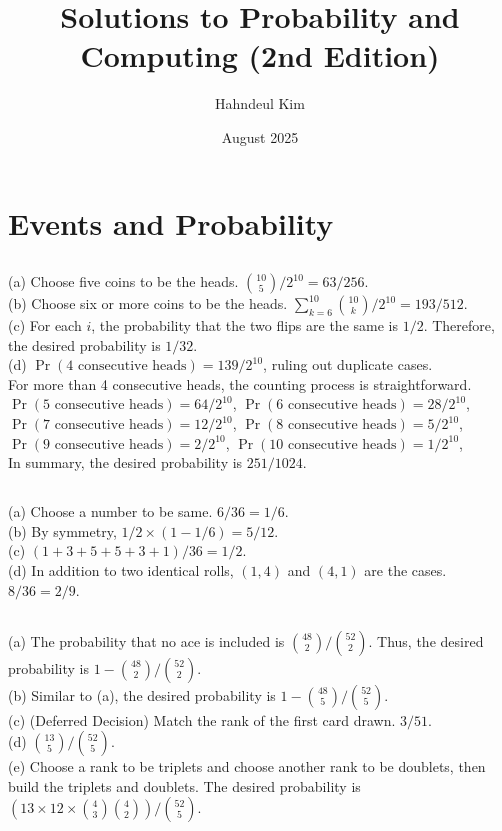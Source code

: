 \documentclass{article}
\title {\myfont Solutions to Probability and Computing (2nd Edition)}
\author{Hahndeul Kim}
\date{August 2025}
\begin{document}
\begin{titlingpage}
\maketitle
\end{titlingpage}
\newpage
\section{Events and Probability}
\subsection{}
(a) Choose five coins to be the heads. $\binom{10}{5} / {2^{10}} = 63/256$.\\
(b) Choose six or more coins to be the heads. $\sum\limits_{k=6}^{10}\binom{10}{k} / {2^{10}} = 193/512$.\\
(c) For each $\textit{i}$, the probability that the two flips are the same is $1/2$. Therefore, the desired probability is $1/32$.\\
(d) $\Pr(\text{4 consecutive heads})=139/2^{10}$, ruling out duplicate cases.\\
For more than 4 consecutive heads, the counting process is straightforward.\\
$\Pr(\text{5 consecutive heads})=64/2^{10}$,
$\Pr(\text{6 consecutive heads})=28/2^{10}$,\\
$\Pr(\text{7 consecutive heads})=12/2^{10}$,
$\Pr(\text{8 consecutive heads})=5/2^{10}$,\\
$\Pr(\text{9 consecutive heads})=2/2^{10}$,
$\Pr(\text{10 consecutive heads})=1/2^{10}$,\\
In summary, the desired probability is $251/1024$.
\subsection{}
(a) Choose a number to be same. $6/36 = 1/6$.\\
(b) By symmetry, $1/2 \times(1-1/6) = 5/12$.\\
(c) $(1+3+5+5+3+1)/36=1/2$.\\
(d) In addition to two identical rolls, $(1,4)$ and $(4,1)$ are the cases. $8/36 = 2/9$.
\subsection{}
(a) The probability that no ace is included is $\binom{48}{2}/\binom{52}{2}$. Thus, the desired probability is $1-\binom{48}{2}/\binom{52}{2}$.\\
(b) Similar to (a), the desired probability is $1-\binom{48}{5}/\binom{52}{5}$.\\
(c) (Deferred Decision) Match the rank of the first card drawn. $3/51$.\\
(d) $\binom{13}{5}/\binom{52}{5}$.\\
(e) Choose a rank to be triplets and choose another rank to be doublets, then build the triplets and doublets. The desired probability is $(13\times12\times\binom{4}{3}\binom{4}{2})/\binom{52}{5}$.
\end{document}
